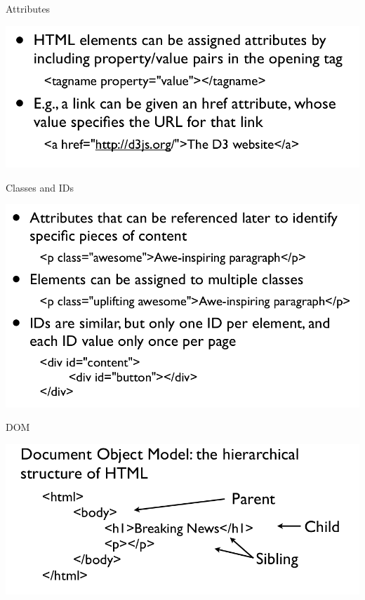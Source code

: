 \documentclass{beamer}
\begin{document}
\begin{frame}{Attributes}
    \begin{center}
        \includegraphics[scale=0.3]{attributes.png}
    \end{center}
\end{frame}
\begin{frame}{Classes and IDs}
    \begin{center}
        \includegraphics[scale=0.3]{classesAndIDs.png}
    \end{center}
\end{frame}
\begin{frame}{DOM}
    \begin{center}
        \includegraphics[scale=0.3]{dom.png}
    \end{center}
\end{frame}
\end{document}

